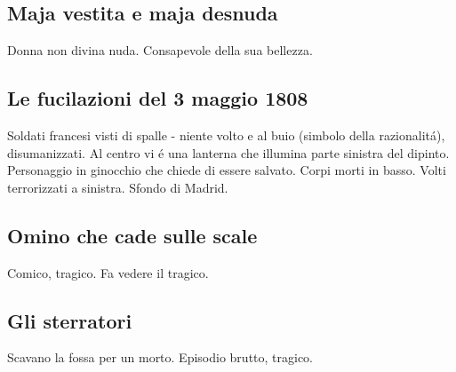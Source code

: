 \documentclass{article}
\begin{document}
\subsection{Maja vestita e maja desnuda}
Donna non divina nuda. Consapevole della sua bellezza.

\subsection{Le fucilazioni del 3 maggio 1808}
Soldati francesi visti di spalle - niente volto e al buio (simbolo della razionalitá), disumanizzati. Al centro vi é una lanterna che illumina parte sinistra del dipinto. Personaggio in ginocchio che chiede di essere salvato. Corpi morti in basso. Volti terrorizzati a sinistra. Sfondo di Madrid.

\subsection{Omino che cade sulle scale}
Comico, tragico. Fa vedere il tragico.

\subsection{Gli sterratori}
Scavano la fossa per un morto. Episodio brutto, tragico.
\end{document}
